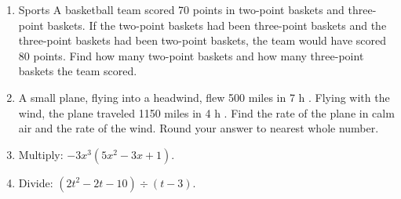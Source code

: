 \documentclass{ximera}
\begin{document}
\begin{enumerate}
  \item Sports A basketball team scored 70 points in two-point baskets and three-point baskets. If the two-point baskets had been three-point baskets and the three-point baskets had been two-point baskets, the team would have scored 80 points. Find how many two-point baskets and how many three-point baskets the team scored.
  \item A small plane, flying into a headwind, flew 500 miles in 7 h . Flying with the wind, the plane traveled 1150 miles in 4 h . Find the rate of the plane in calm air and the rate of the wind. Round your answer to nearest whole number.
  \item Multiply: $-3 x^{3}\left(5 x^{2}-3 x+1\right)$.
  \item Divide: $\left(2 t^{2}-2 t-10\right) \div(t-3)$.
\end{enumerate}
\end{document}
